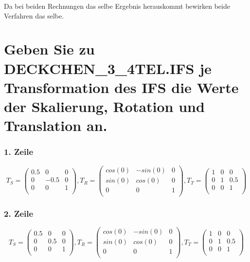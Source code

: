 \documentclass[]{article}
\begin{document}
 Da bei beiden Rechnungen das selbe Ergebnis herauskommt bewirken beide Verfahren das selbe.
 
\section{Geben Sie zu DECKCHEN\_3\_4TEL.IFS je Transformation des IFS die Werte der Skalierung, Rotation und Translation an. }
\subsubsection*{1. Zeile}
\[
T_S = \begin{pmatrix}
 	0.5 & 0 & 0 \\
 	0 & -0.5 & 0 \\
 	0 & 0 & 1 \\
 \end{pmatrix},
 T_R = \begin{pmatrix}
 cos(0) & -sin(0) & 0 \\
 sin(0) & cos(0) & 0 \\
 0 & 0 & 1 \\
 \end{pmatrix},
 T_T = \begin{pmatrix}
 1 & 0 & 0 \\
 0 & 1 & 0.5 \\
 0 & 0 & 1 \\
 \end{pmatrix}
 \]
 
 \subsubsection*{2. Zeile}
\[
T_S = \begin{pmatrix}
0.5 & 0 & 0 \\
0 & 0.5 & 0 \\
0 & 0 & 1 \\
\end{pmatrix},
T_R = \begin{pmatrix}
cos(0) & -sin(0) & 0 \\
sin(0) & cos(0) & 0 \\
0 & 0 & 1 \\
\end{pmatrix},
T_T = \begin{pmatrix}
1 & 0 & 0 \\
0 & 1 & 0.5 \\
0 & 0 & 1 \\
\end{pmatrix}
\]
 
\end{document}
